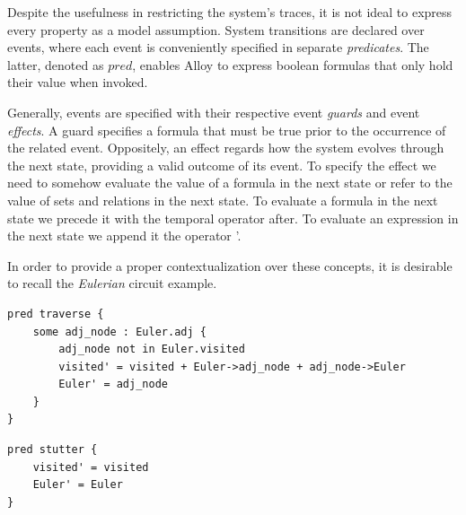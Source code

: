 Despite the usefulness in restricting the system's traces, it is not ideal to express every property as a model assumption. System transitions are declared over events, where each event is conveniently specified in separate \textit{predicates}. The latter, denoted as $pred$, enables Alloy to express boolean formulas that only hold their value when invoked. 

Generally, events are specified with their respective event \textit{guards} and event \textit{effects}. A guard specifies a formula that must be true prior to the occurrence of the related event. Oppositely, an effect regards how the system evolves through the next state, providing a valid outcome of its event. To specify the effect we need to somehow evaluate the value of a formula in the next state or refer to the value of sets and relations in the next state. To evaluate a formula in the next state we precede it with the temporal operator after. To evaluate an expression in the next state we append it the operator '.

In order to provide a proper contextualization over these concepts, it is desirable to recall the \textit{Eulerian} circuit example. 

\begin{lstlisting}[title={Graph visiting event.}, otherkeywords = {pred, some, \:, \., not, in, ', \=, \+, \-\>}, floatplacement=H]
pred traverse {
    some adj_node : Euler.adj {
        adj_node not in Euler.visited
        visited' = visited + Euler->adj_node + adj_node->Euler
        Euler' = adj_node
    }
}
\end{lstlisting}

\begin{lstlisting}[title={Graph stutter event.}, otherkeywords = {pred, ', \=}, floatplacement=H]
pred stutter {
    visited' = visited
    Euler' = Euler
}
\end{lstlisting}
    



